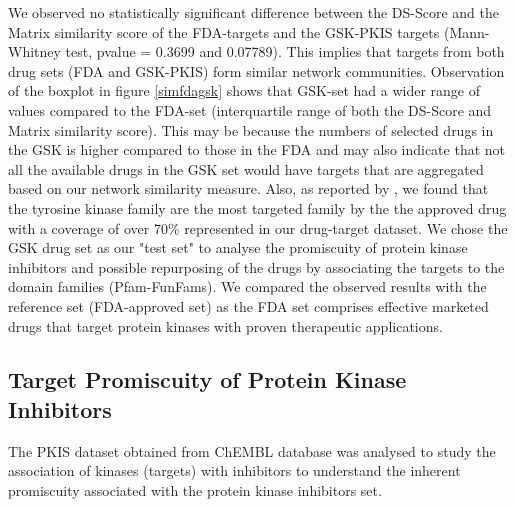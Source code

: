 \documentclass[a4paper, 11pt]{report}
\begin{document}
We observed no statistically significant difference between the DS-Score and the Matrix similarity score of the FDA-targets and the GSK-PKIS targets (Mann-Whitney test, pvalue = 0.3699 and 0.07789). This implies that targets from both drug sets (FDA and GSK-PKIS) form similar network communities. Observation of the boxplot in figure \ref{simfdagsk} shows that GSK-set had a wider range of values compared to the FDA-set (interquartile range of both the DS-Score and Matrix similarity score). This may be because the numbers of selected drugs in the GSK is higher compared to those in the FDA and may also indicate that not all the available drugs in the GSK set would have targets that are aggregated based on our network similarity measure. Also, as reported by \cite{wu2015fda}, we found that the tyrosine kinase family are the most targeted family by the the approved drug with a coverage of over 70\% represented in our drug-target dataset. We chose the GSK drug set as our "test set" to analyse the promiscuity of protein kinase inhibitors and possible repurposing of the drugs by associating the targets to the domain families (Pfam-FunFams). We compared the observed results with the reference set (FDA-approved set) as the FDA set comprises effective marketed drugs that target protein kinases with proven therapeutic applications.

\subsection{Target Promiscuity of Protein Kinase Inhibitors}
The PKIS dataset obtained from ChEMBL database was analysed to study the association of kinases (targets) with inhibitors to understand the inherent promiscuity associated with the protein kinase inhibitors set. 
\end{document}
